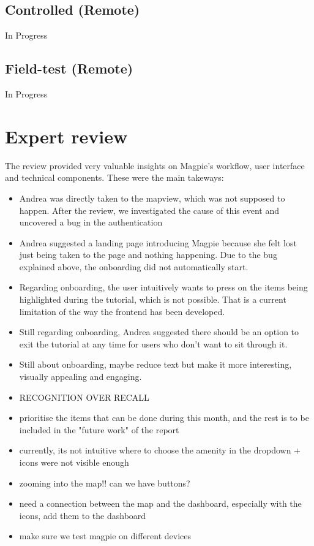\documentclass{report}
\begin{document}
\subsection{Controlled (Remote)}
In Progress
\subsection{Field-test (Remote)}
In Progress

\section{Expert review}
The review provided very valuable insights on Magpie's workflow, user interface and technical components. These were the main takeways:
\begin{itemize}
    \item Andrea was directly taken to the mapview, which was not supposed to happen. After the review, we investigated the cause of this event and uncovered a bug in the authentication
    \item Andrea suggested a landing page introducing Magpie because she felt lost just being taken to the page and nothing happening. Due to the bug explained above, the onboarding did not automatically start.
    \item Regarding onboarding, the user intuitively wants to press on the items being highlighted during the tutorial, which is not possible. That is a current limitation of the way the frontend has been developed.
    \item Still regarding onboarding, Andrea suggested there should be an option to exit the tutorial at any time for users who don't want to sit through it.
    \item Still about onboarding, maybe reduce text but make it more interesting, visually appealing and engaging.
    \item RECOGNITION OVER RECALL
    \item prioritise the items that can be done during this month, and the rest is to be included in the "future work" of the report
    \item currently, its not intuitive where to choose the amenity in the dropdown + icons were not visible enough
    \item zooming into the map!! can we have buttons?
    \item need a connection between the map and the dashboard, especially with the icons, add them to the dashboard
    \item make sure we test magpie on different devices

\end{itemize}
\end{document}
